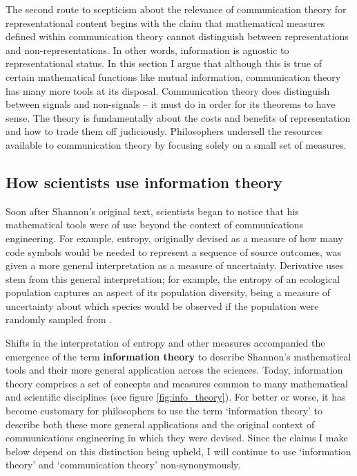 \documentclass[12pt]{article}
\begin{document}
The second route to scepticism about the relevance of communication theory for representational content begins with the claim that mathematical measures defined within communication theory cannot distinguish between representations and non-representations.
In other words, information is agnostic to representational status.
In this section I argue that although this is true of certain mathematical functions like mutual information, communication theory has many more tools at its disposal.
Communication theory does distinguish between signals and non-signals -- it must do in order for its theorems to have sense.
The theory is fundamentally about the costs and benefits of representation and how to trade them off judiciously.
Philosophers undersell the resources available to communication theory by focusing solely on a small set of measures.

\subsection{How scientists use information theory}\label{subsec:scientists}

Soon after Shannon's original text, scientists began to notice that his mathematical tools were of use beyond the context of communications engineering.
For example, entropy, originally devised as a measure of how many code symbols would be needed to represent a sequence of source outcomes, was given a more general interpretation as a measure of uncertainty.
Derivative uses stem from this general interpretation; for example, the entropy of an ecological population captures an aspect of its population diversity, being a measure of uncertainty about which species would be observed if the population were randomly sampled from \citep{margalef1957information}.

Shifts in the interpretation of entropy and other measures accompanied the emergence of the term \textbf{information theory} to describe Shannon's mathematical tools and their more general application across the sciences.
Today, information theory comprises a set of concepts and measures common to many mathematical and scientific disciplines (see figure \ref{fig:info_theory}).
For better or worse, it has become customary for philosophers to use the term `information theory' to describe both these more general applications and the original context of communications engineering in which they were devised.
Since the claims I make below depend on this distinction being upheld, I will continue to use `information theory' and `communication theory' non-synonymously.
\end{document}
